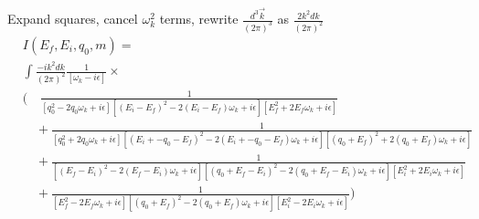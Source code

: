Expand squares, cancel $\omega_k^2$ terms, rewrite $\frac{d^3 \vec{k}}{(2\pi)^3}$ as $\frac{2 k^2 d k}{(2\pi)^2}$
\begin{align*}
&I(E_f, E_i, q_0, m) = \\
&\int \frac{-i k^2 d k}{(2\pi)^2}\frac{1}{\left[\omega_k - i \epsilon\right]} \times\\
&\bigg(\quad\frac{1}{
\left[q_0^2 - 2 q_0\omega_k + i\epsilon\right]
\left[(E_i - E_f)^2 - 2(E_i - E_f)\omega_k + i\epsilon\right]
\left[E_f^2 + 2 E_f\omega_k + i\epsilon\right]
} \\
&\quad + \frac{1}{
\left[q_0^2  + 2 q_0\omega_k + i\epsilon\right]
\left[(E_i + -q_0  -E_f)^2  -2(E_i + -q_0  -E_f)\omega_k + i\epsilon\right]
\left[(q_0 + E_f)^2 + 2(q_0 + E_f)\omega_k + i\epsilon\right]
} \\
&\quad + \frac{1}{
\left[(E_f - E_i)^2 - 2(E_f - E_i)\omega_k + i\epsilon\right]
\left[(q_0 + E_f - E_i)^2 - 2(q_0 + E_f - E_i)\omega_k + i\epsilon\right]
\left[E_i^2 + 2 E_i\omega_k + i\epsilon\right]
} \\
&\quad + \frac{1}{
\left[E_f^2 - 2 E_f\omega_k + i\epsilon\right]
\left[(q_0 + E_f)^2 - 2(q_0 + E_f)\omega_k + i\epsilon\right]
\left[E_i^2 - 2 E_i\omega_k + i\epsilon\right]
} \bigg)
\end{align*}